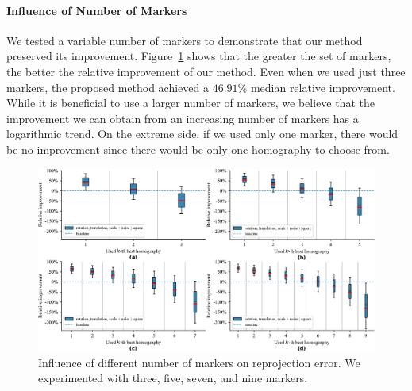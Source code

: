 \paragraph{Influence of Number of Markers}
We tested a variable number of markers to demonstrate that our method preserved its improvement. Figure~\ref{fig:NMarkersInfluence} shows that the greater the set of markers, the better the relative improvement of our method. Even when we used just three markers, the proposed method achieved a $46.91$\% median relative improvement.
While it is beneficial to use a larger number of markers, we believe that the improvement we can obtain from an increasing number of markers has a logarithmic trend. On the extreme side, if we used only one marker, there would be no improvement since there would be only one homography to choose from.

\begin{figure}[t]
    \centering
    \includegraphics[width=\linewidth]{figures/homography/n_markers_influence.pdf}
    \caption{Influence of different number of markers on reprojection error. We experimented with  three,  five,  seven, and  nine markers.}
    \label{fig:NMarkersInfluence}
\end{figure}

